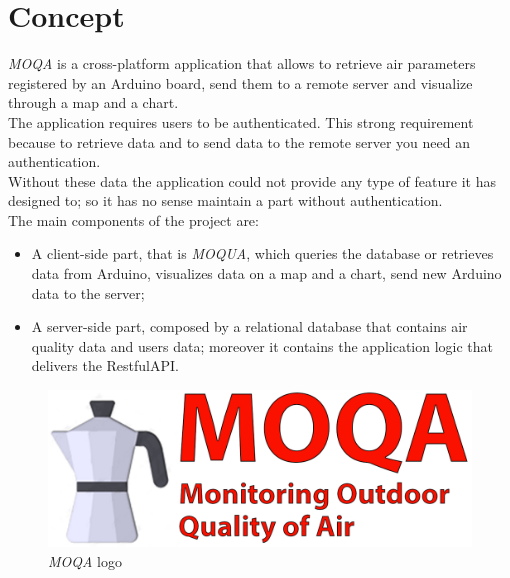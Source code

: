 \section{Concept}
\textit{MOQA} is a cross-platform application that allows to retrieve air parameters registered by an Arduino board, send them to a remote server and visualize through a map and a chart.\\

The application requires users to be authenticated. This strong requirement because to retrieve data and to send data to the remote server you need an authentication. \\ 
Without these data the application could not provide any type of feature it has designed to; so it has no sense maintain a part without authentication.\\

The main components of the project are:
\begin{itemize}
    \item A client-side part, that is \textit{MOQUA}, which queries the database or retrieves data from Arduino, visualizes data on a map and a chart, send new Arduino data to the server;
    \item A server-side part, composed by a relational database that contains air quality data and users data; moreover it contains the application logic that delivers the RestfulAPI.
\end{itemize}

\begin{figure}[h]
\begin{center}
  \includegraphics{img/logo_moqa.png}
  \hspace{0.05\linewidth}
  \centering
  \caption{\textit{MOQA} logo}
  \label{img:logo_moqa}
\end{center}
\end{figure}